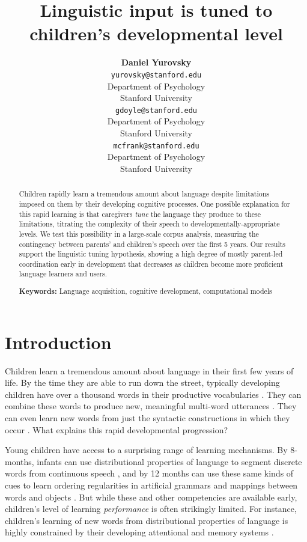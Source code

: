 \documentclass[10pt,letterpaper]{article}
\title{Linguistic input is tuned to children's developmental level}
\author{{\large \bf Daniel Yurovsky} \\ \texttt{yurovsky@stanford.edu}\\ Department of Psychology \\ Stanford University
 	\And {\large \bf Gabriel Doyle} \\ \texttt{gdoyle@stanford.edu} \\ Department of Psychology \\ Stanford University
	\And {\large \bf Michael C. Frank} \\ \texttt{mcfrank@stanford.edu} \\ Department of Psychology \\ Stanford University}
\begin{document}
\maketitle

\begin{abstract}

Children rapidly learn a tremendous amount about language despite limitations imposed on them by their developing cognitive processes. One possible explanation for this rapid learning is that caregivers \emph{tune} the language they produce to these limitations, titrating the complexity of their speech to developmentally-appropriate levels. We test this possibility in a large-scale corpus analysis, measuring the contingency between parents' and children's speech over the first 5 years. Our results support the linguistic tuning hypothesis, showing a high degree of mostly parent-led coordination early in development that decreases as children become more proficient language learners and users.

\textbf{Keywords:}
Language acquisition, cognitive development, computational models
\end{abstract}

\section{Introduction}

Children learn a tremendous amount about language in their first few years of life. By the time they are able to run down the street, typically developing children have over a thousand words in their productive vocabularies \cite{mayor2011}. They can combine these words to produce new, meaningful multi-word utterances \cite{lieven2009}. They can even learn new words from just the syntactic constructions in which they occur \cite{yuan2009}. What explains this rapid developmental progression?

Young children have access to a surprising range of learning mechanisms. By 8-months, infants can use distributional properties of language to segment discrete words from continuous speech \cite{saffran1996}, and by 12 months can use these same kinds of cues to learn ordering regularities in artificial grammars \cite{gomez1999} and mappings between words and objects \cite{smith2008}. But while these and other competencies are available early, children's level of learning \emph{performance} is often strikingly limited. For instance, children's learning of new words from distributional properties of language is highly constrained by their developing attentional and memory systems \cite{vlach2013}.
\end{document}
